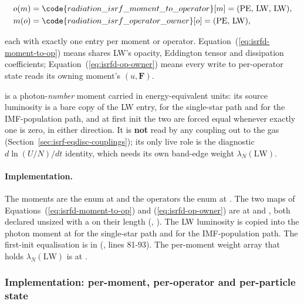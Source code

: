 \begin{align}
  o(m) &= \code{radiation\_isrf\_moment\_to\_operator}[m] = (\mathrm{PE},\,\mathrm{LW},\,\mathrm{LW}),
  \label{eq:isrfd-moment-to-op} \\
  m(o) &= \code{radiation\_isrf\_operator\_owner}[o] = (\mathrm{PE},\,\mathrm{LW}),
  \label{eq:isrfd-op-owner}
\end{align}

each with exactly one entry per moment or operator.
Equation~(\ref{eq:isrfd-moment-to-op}) means
 shares LW's opacity, Eddington tensor and
dissipation coefficients; Equation~(\ref{eq:isrfd-op-owner}) means every write to
per-operator state reads its owning moment's $(u,\boldsymbol{F})$.

 is a photon-\emph{number} moment carried in
energy-equivalent units: its source luminosity is a bare copy of the LW entry,
for the single-star path and for the IMF-population path, and at first init the
two are forced equal whenever exactly one is zero, in either direction. It is
\textbf{not} read by any coupling out to the gas
(Section~\ref{sec:isrf-eqdisc-couplings}); its only live role is the diagnostic
$d\ln(U/N)/dt$ identity, which needs its own band-edge weight
$\lambda_N(\mathrm{LW})$.

\paragraph{Implementation.} The moments are the enum at
 and the operators the enum at
. The two maps of
Equations~(\ref{eq:isrfd-moment-to-op}) and (\ref{eq:isrfd-op-owner}) are at
 and , both declared unsized with a
 on their length (,
). The LW luminosity is copied into the photon moment at
 for the single-star path and
 for the IMF-population path. The first-init equalisation is
in  (, lines
81-93). The per-moment weight array that holds $\lambda_N(\mathrm{LW})$ is at
.

\subsubsection{Implementation: per-moment, per-operator and per-particle state}

